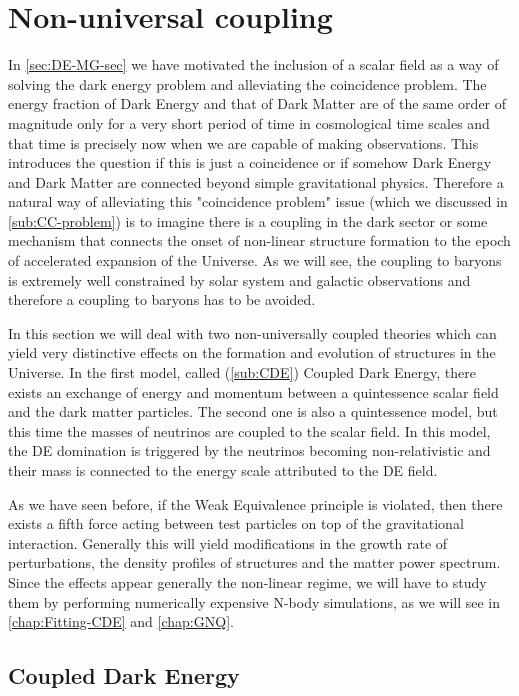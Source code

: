 \section{Non-universal coupling \label{sec:nonuniversal-coupling}}

In \cref{sec:DE-MG-sec} we have motivated the inclusion of a scalar field as a 
way of solving the dark energy problem and alleviating the coincidence problem.
The energy fraction of Dark Energy and that of Dark Matter are of the same
order of magnitude only for a very short period of time in cosmological time scales and that time is precisely
now when we are capable of making observations. This introduces the question if this is just a coincidence or 
if somehow Dark Energy and Dark Matter are connected beyond simple gravitational physics.
Therefore a natural way of alleviating this "coincidence problem" issue (which we discussed in \cref{sub:CC-problem})
is to imagine there is a coupling in the dark sector or some mechanism that connects the onset of non-linear 
structure formation to the epoch of accelerated expansion of the Universe. As we will see, the coupling to baryons 
is extremely well constrained by solar system and galactic observations and therefore a coupling to baryons 
has to be avoided.

In this section we will deal with two non-universally coupled theories which can yield very distinctive 
effects on the formation and evolution of structures in the Universe.
In the first model, called (\cref{sub:CDE}) Coupled Dark Energy, there exists an exchange of energy and momentum
between a quintessence scalar field and the dark matter particles. 
The second one is also a quintessence model, but this time the masses of neutrinos are 
coupled to the scalar field. In this model, the DE domination is triggered by the neutrinos becoming non-relativistic
and their mass is connected to the energy scale attributed to the DE field.

As we have seen before, if the Weak Equivalence principle is violated, then there exists a fifth force acting between test
particles on top of the gravitational interaction. Generally this will yield modifications in the growth rate of perturbations, 
the density profiles of structures and the matter power spectrum. Since the effects appear generally the non-linear regime,
we will have to study them by performing numerically expensive N-body simulations, as we will see in \cref{chap:Fitting-CDE}
and \cref{chap:GNQ}.


\subsection{Coupled Dark Energy \label{sub:CDE}}

